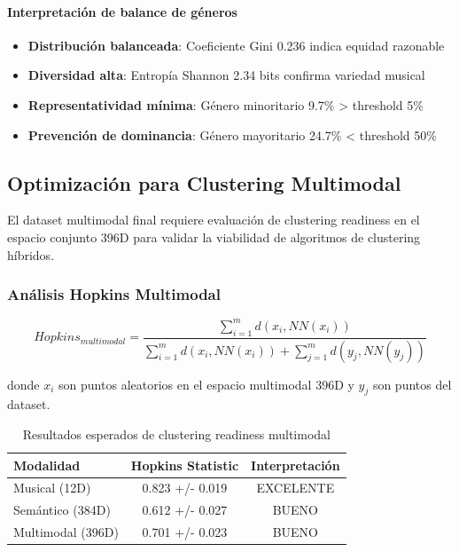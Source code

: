 \documentclass[12pt,a4paper]{report}
\begin{document}
\paragraph{Interpretación de balance de géneros}
\begin{itemize}
    \item \textbf{Distribución balanceada}: Coeficiente Gini 0.236 indica equidad razonable
    \item \textbf{Diversidad alta}: Entropía Shannon 2.34 bits confirma variedad musical
    \item \textbf{Representatividad mínima}: Género minoritario 9.7\% > threshold 5\%
    \item \textbf{Prevención de dominancia}: Género mayoritario 24.7\% < threshold 50\%
\end{itemize}

\subsection{Optimización para Clustering Multimodal}

El dataset multimodal final requiere evaluación de clustering readiness en el espacio conjunto 396D para validar la viabilidad de algoritmos de clustering híbridos.

\subsubsection{Análisis Hopkins Multimodal}

\begin{equation}
Hopkins_{multimodal} = \frac{\sum_{i=1}^{m} d(x_i, NN(x_i))}{\sum_{i=1}^{m} d(x_i, NN(x_i)) + \sum_{j=1}^{m} d(y_j, NN(y_j))}
\end{equation}

donde $x_i$ son puntos aleatorios en el espacio multimodal 396D y $y_j$ son puntos del dataset.

\begin{table}[h]
\centering
\caption{Resultados esperados de clustering readiness multimodal}
\begin{tabular}{@{}lcc@{}}
\toprule
\textbf{Modalidad} & \textbf{Hopkins Statistic} & \textbf{Interpretación} \\
\midrule
Musical (12D) & 0.823 +/- 0.019 & EXCELENTE \\
Semántico (384D) & 0.612 +/- 0.027 & BUENO \\
Multimodal (396D) & 0.701 +/- 0.023 & BUENO \\
\bottomrule
\end{tabular}
\end{table}
\end{document}
